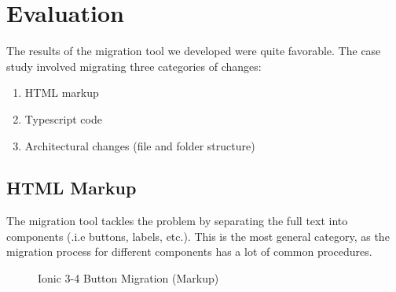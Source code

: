 \documentclass[conference]{IEEEtran}
\begin{document}
\section{Evaluation}

The results of the migration tool we developed were quite favorable. The case study
involved migrating three categories of changes:
\begin{enumerate}
    \item HTML markup
    \item Typescript code
    \item Architectural changes (file and folder structure)
\end{enumerate}

\subsection{HTML Markup}
The migration tool tackles the problem by separating the full
text into components (.i.e buttons, labels, etc.). This is the most
general category, as the migration process for different components
has a lot of common procedures.
\begin{figure}[!htb]
    \centering
    \qquad
    \caption{Ionic 3-4 Button Migration (Markup)}
    \label{fig:ionicButtonMigration}
\end{figure}
\end{document}
